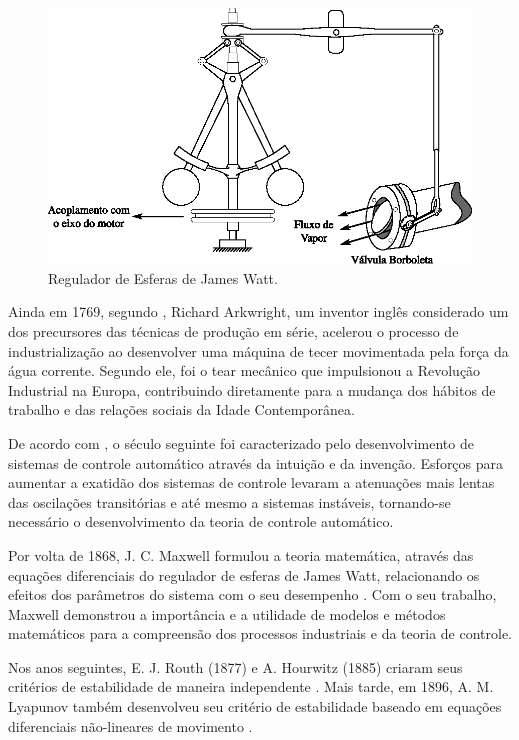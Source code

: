 \begin{figure}[htb]
\centering
    \includegraphics{imgs/introducao/eps/regulador_esferas}
    \caption{Regulador de Esferas de James Watt.}
    \label{fig:controlador_james}
\end{figure}

Ainda em 1769, segundo , Richard Arkwright, um inventor
inglês considerado um dos precursores das técnicas de produção em série,
acelerou o processo de industrialização ao desenvolver uma máquina de tecer
movimentada pela força da água corrente. Segundo ele, foi o tear mecânico que
impulsionou a Revolução Industrial na Europa, contribuindo diretamente para a
mudança dos hábitos de trabalho e das relações sociais da Idade Contemporânea. 

De acordo com , o século seguinte foi caracterizado pelo
desenvolvimento de sistemas de controle automático através da intuição e da
invenção. Esforços para aumentar a exatidão dos sistemas de controle levaram a
atenuações mais lentas das oscilações transitórias e até mesmo a sistemas
instáveis, tornando-se necessário o desenvolvimento da teoria de controle
automático.

Por volta de 1868, J. C. Maxwell formulou a teoria matemática, através das
equações diferenciais do regulador de esferas de James Watt, relacionando os
efeitos dos parâmetros do sistema com o seu desempenho \cite{maxwell:1964}. Com
o seu trabalho, Maxwell demonstrou a importância e a utilidade de modelos e
métodos matemáticos para a compreensão dos processos industriais e da teoria de
controle.

Nos anos seguintes, E. J. Routh (1877) e A. Hourwitz (1885) criaram seus
critérios de estabilidade de maneira independente
\cite{routh:1877,bennett:1996}. Mais tarde, em 1896, A. M. Lyapunov também
desenvolveu seu critério de estabilidade baseado em equações diferenciais
não-lineares de movimento \cite{faccin:2004}.

